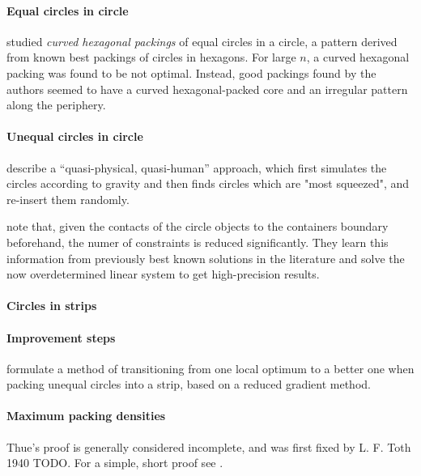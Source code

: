 \paragraph{Equal circles in circle}

\textcite{lubachevsky1997curved} studied \emph{curved hexagonal packings} of equal circles in a circle, a pattern derived from known best packings of circles in hexagons. For large $n$, a curved hexagonal packing was found to be not optimal. Instead, good packings found by the authors seemed to have a curved hexagonal-packed core and an irregular pattern along the periphery.

\paragraph{Unequal circles in circle}

\textcite{WHZX2002improved} describe a “quasi-physical, quasi-human” approach, which first simulates the circles according to gravity and then finds circles which are "most squeezed", and re-insert them randomly.

\textcite{BG2010new} note that, given the contacts of the circle objects to the containers boundary beforehand, the numer of constraints is reduced significantly. They learn this information from previously best known solutions in the literature and solve the now overdetermined linear system to get high-precision results.

\paragraph{Circles in strips}

\paragraph{Improvement steps}

 formulate a method of transitioning from one local optimum to a better one when packing unequal circles into a strip, based on a reduced gradient method.

\paragraph{Maximum packing densities}

Thue's proof is generally considered incomplete, and was first fixed by L. F. Toth 1940 TODO. For a simple, short proof see \cite{CW2010simple}.

